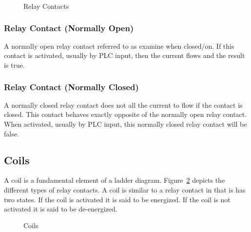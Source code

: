 \begin{figure}[!htb]
\begin{center}
\end{center}
\caption[skip=-6pt]{Relay Contacts}
\label{fig:relayContacts}
\end{figure}

\subsubsection*{Relay Contact (Normally Open)}
A normally open relay contact referred to as examine when closed/on. If this contact is activated, usually by PLC input, then the current flows and the result is true.

\subsubsection*{Relay Contact (Normally Closed)}
A normally closed relay contact does not all the current to flow if the contact is closed. This contact behaves exactly opposite of the normally open relay contact. When activated, usually by PLC input, this normally closed relay contact will be false. 


\subsection{Coils}
A coil is a fundamental element of a ladder diagram. Figure~\ref{fig:coils} depicts the different types of relay contacts. A coil is similar to a relay contact in that is has two states. If the coil is activated it is said to be energized. If the coil is not activated it is said to be de-energized.

\begin{figure}[!htb]
\begin{center}
\end{center}
\caption[skip=-8pt]{Coils}
\label{fig:coils}
\end{figure}

